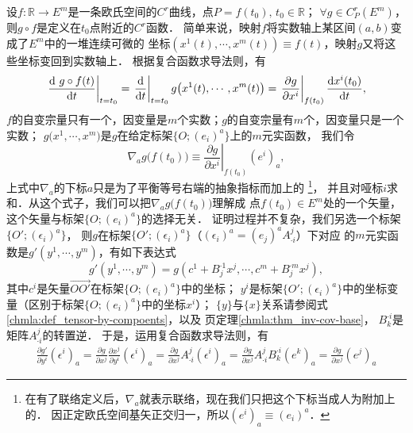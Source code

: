 设$f:\mathbb{R}\to E^m$是一条欧氏空间的$C^r$曲线，点$P=f(t_0),\, t_0\in \mathbb{R}$；
$\forall g\in C^r_P(E^m)$，则$g\circ f$是定义在$t_0$点附近的$C^r$函数．
简单来说，映射$f$将实数轴上某区间$(a,b)$变成了$E^m$中的一堆连续可微的
坐标$(x^1(t),\cdots, x^m(t))\equiv f(t)$，映射$g$又将这些坐标变回到实数轴上．
根据复合函数求导法则，有
\begin{equation}\label{chdm:eqn_dgf}
    \left.\frac{{\rm d}\ g\circ f(t)}{{\rm d}t}\right| _{t=t_0} =
     \left.\frac{{\rm d} }{{\rm d}t}\right| _{t=t_0}
     g\bigl(x^1(t),\cdots, x^m(t)\bigr)
     =\left.\frac{\partial g}{\partial x^i}\right| _{f(t_0)}
     \frac{{\rm d} x^i(t_0)}{{\rm d}t} ,
\end{equation}
$f$的自变宗量只有一个，因变量是$m$个实数；$g$的自变宗量有$m$个，因变量只是一个实数；
$g\bigl(x^1,\cdots, x^m\bigr)$是$g$在给定标架$\{O;(e_i)^a\}$上的$m$元实函数，
我们令
\begin{equation}\label{chdm:eqn_ngea}
    \nabla_a g\bigl(f(t_0)\bigr) \equiv 
    \left.\frac{\partial g}{\partial x^i}\right| _{f(t_0)}(e^i)_a ,
\end{equation}
上式中$\nabla_a$的下标$a$只是为了平衡等号右端的抽象指标而加上的
{\footnote{在有了联络定义后，$\nabla_a$就表示联络，现在我们只把这个下标当成人为附加上的．
因正定欧氏空间基矢正交归一，所以$(e^i)_a\equiv (e_i)^a$．}}，
并且对哑标$i$求和．从这个式子，我们可以把$\nabla_a g\bigl(f(t_0)\bigr)$理解成
点$f(t_0)\in E^m$处的一个矢量，这个矢量与标架$\{O;(e_i)^a\}$的选择无关．
证明过程并不复杂，我们另选一个标架$\{O';(\epsilon_i)^a\}$，
则$g$在标架$\{O';(\epsilon_i)^a\}$（$(\epsilon_i)^a=(e_j)^a A^j_{\cdot i}$）下对应
的$m$元实函数是$g'(y^1,\cdots,y^m)$，有如下表达式
\begin{equation}\label{chdm:eqn_gpgB}
    g'(y^1,\cdots,y^m)=g(c^1+B^{\cdot 1}_j x^j,\cdots,c^m+B^{\cdot m}_j x^j) ,
\end{equation}
其中$c^i$是矢量$\overrightarrow{OO'}$在标架$\{O;(e_i)^a\}$中的坐标；
$y^i$是标架$\{O';(\epsilon_i)^a\}$中的坐标变量（区别于标架$\{O;(e_i)^a\}$中的坐标$x^i$）；
$\{y\}$与$\{x\}$关系请参阅式\eqref{chmla:def_tensor-by-compoents}，以及
\pageref{chmla:thm_inv-cov-base}页定理\ref{chmla:thm_inv-cov-base}，
$B^{\cdot i}_k$是矩阵$A^j_{\cdot i}$的转置逆．
于是，运用复合函数求导法则，有
\begin{align}
    \frac{\partial g'}{\partial y^i}(\epsilon^i)_a = 
    \frac{\partial g}{\partial x^j}\frac{\partial x^j}{\partial y^i} (\epsilon^i)_a = 
    \frac{\partial g}{\partial x^j}A^j_{\cdot i} (\epsilon^i)_a = 
    \frac{\partial g}{\partial x^j}A^j_{\cdot i} B^{\cdot i}_k (e^k)_a
    =\frac{\partial g}{\partial x^j} (e^j)_a  \label{chdm:eqn_gpgeA}
\end{align}
